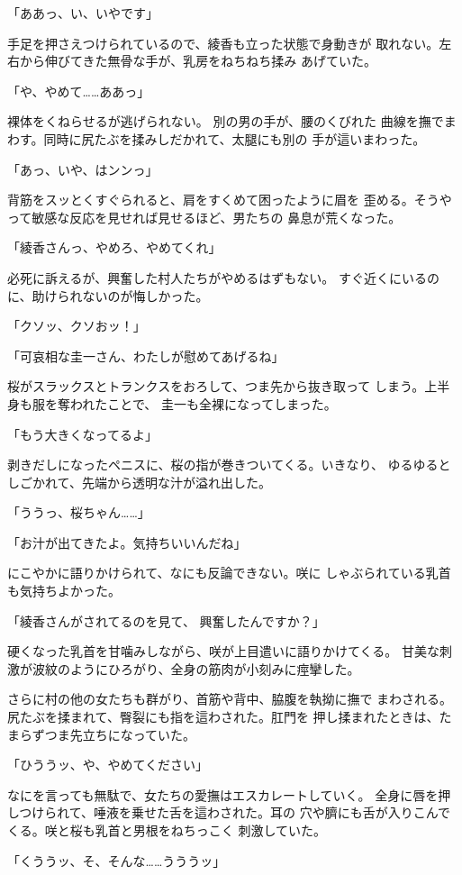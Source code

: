 ﻿\documentclass[
    book,tate,
    line_length=30zw,
    jafontsize=12pt,
    paper=b5j,
    landscape,
    ]{jlreq}
\begin{document}
「ああっ、い、いやです」

手足を押さえつけられているので、綾香も立った状態で身動きが
取れない。左右から伸びてきた無骨な手が、乳房をねちねち揉み
あげていた。

「や、やめて……ああっ」

裸体をくねらせるが逃げられない。 別の男の手が、腰のくびれた
曲線を撫でまわす。同時に尻たぶを揉みしだかれて、太腿にも別の
手が這いまわった。

「あっ、いや、はンンっ」

背筋をスッとくすぐられると、肩をすくめて困ったように眉を
歪める。そうやって敏感な反応を見せれば見せるほど、男たちの
鼻息が荒くなった。

「綾香さんっ、やめろ、やめてくれ」

必死に訴えるが、興奮した村人たちがやめるはずもない。
すぐ近くにいるのに、助けられないのが悔しかった。

「クソッ、クソおッ！」

「可哀相な圭一さん、わたしが慰めてあげるね」

桜がスラックスとトランクスをおろして、つま先から抜き取って
しまう。上半身も服を奪われたことで、 圭一も全裸になってしまった。

「もう大きくなってるよ」

剥きだしになったペニスに、桜の指が巻きついてくる。いきなり、
ゆるゆるとしごかれて、先端から透明な汁が溢れ出した。

「ううっ、桜ちゃん……」

「お汁が出てきたよ。気持ちいいんだね」

にこやかに語りかけられて、なにも反論できない。咲に
しゃぶられている乳首も気持ちよかった。

「綾香さんがされてるのを見て、
興奮したんですか？」

硬くなった乳首を甘噛みしながら、咲が上目遣いに語りかけてくる。
甘美な刺激が波紋のようにひろがり、全身の筋肉が小刻みに痙攣した。

さらに村の他の女たちも群がり、首筋や背中、脇腹を執拗に撫で
まわされる。尻たぶを揉まれて、臀裂にも指を這わされた。肛門を
押し揉まれたときは、たまらずつま先立ちになっていた。

「ひううッ、や、やめてください」

なにを言っても無駄で、女たちの愛撫はエスカレートしていく。
全身に唇を押しつけられて、唾液を乗せた舌を這わされた。耳の
穴や臍にも舌が入りこんでくる。咲と桜も乳首と男根をねちっこく
刺激していた。

「くううッ、そ、そんな……うううッ」
\end{document}
